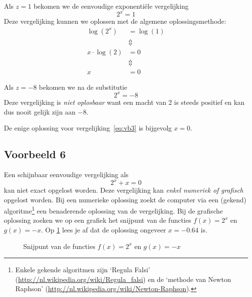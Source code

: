 Als $z=1$ bekomen we de eenvoudige exponenti\"ele vergelijking
\[
 2^{x}  =  1
\]
Deze vergelijking kunnen we oplossen met de algemene oplossingsmethode:
\begin{align*}
    \log\left(2^x\right) &=  \log(1) \\
     &\Updownarrow  \\
    x\cdot \log(2) &= 0 \\
     &\Updownarrow  \\
    x &=  0
\end{align*}

Als $z=-8$ bekomen we na de substitutie
 \begin{displaymath}
    2^{x} = -8  
    \end{displaymath}
    Deze  vergelijking is \emph{niet oplosbaar} want een macht van 2 is steeds positief en kan dus nooit gelijk zijn aan $-8$. 
    
   De enige oplossing voor vergelijking~\eqref{eq:vb3} is bijgevolg $x=0$.

    \subsection{Voorbeeld 6}
    Een schijnbaar eenvoudige vergelijking als
    \begin{displaymath}
        2^{x}+x = 0
    \end{displaymath}
      kan niet exact opgelost worden. Deze
      vergelijking kan \emph{enkel numeriek of grafisch} opgelost worden.
      Bij een numerieke oplossing zoekt de computer via een (gekend) algoritme\footnote{Enkele gekende algoritmen zijn `Regula Falsi' (\url{http://nl.wikipedia.org/wiki/Regula\_falsi}) en de `methode van Newton Raphson' (\url{http://nl.wikipedia.org/wiki/Newton-Raphson}).} een benaderende oplossing van de vergelijking. 
      Bij de grafische oplossing zoeken we op een grafiek het snijpunt van de functies $f(x)=2^x$ en $g(x)=-x$.
      Op \cref{fig:snijp3} lees je af dat de oplossing ongeveer $x=\num{-0.64}$ is.
\begin{figure}[htbp]
  \centering
  \caption{Snijpunt van de functies $f(x)=2^x$ en $g(x)=-x$}
  \label{fig:snijp3}
\end{figure}



